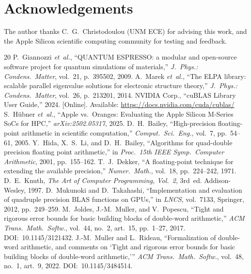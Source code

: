 \documentclass[conference]{IEEEtran}
\begin{document}
\section*{Acknowledgements}
The author thanks C.~G.~Christodoulou (UNM ECE) for advising this work, and the Apple Silicon scientific computing community for testing and feedback.
\balance

\begin{thebibliography}{20}
P.~Giannozzi \emph{et~al.}, ``QUANTUM ESPRESSO: a modular and open-source software project for quantum simulations of materials,'' \emph{J.~Phys.: Condens.\ Matter}, vol.~21, p.~395502, 2009.
A.~Marek \emph{et~al.}, ``The ELPA library: scalable parallel eigenvalue solutions for electronic structure theory,'' \emph{J.~Phys.: Condens.\ Matter}, vol.~26, p.~213201, 2014.
NVIDIA Corp., ``cuBLAS Library User Guide,'' 2024. [Online]. Available: \url{https://docs.nvidia.com/cuda/cublas/}
S.~H\"ubner \emph{et~al.}, ``Apple vs.\ Oranges: Evaluating the Apple Silicon M-Series SoCs for HPC,'' \emph{arXiv:2502.05317}, 2025.
D.~H.~Bailey, ``High-precision floating-point arithmetic in scientific computation,'' \emph{Comput.\ Sci.\ Eng.}, vol.~7, pp.~54--61, 2005.
Y.~Hida, X.~S.~Li, and D.~H.~Bailey, ``Algorithms for quad-double precision floating point arithmetic,'' in \emph{Proc.\ 15th IEEE Symp.\ Computer Arithmetic}, 2001, pp.~155--162.
T.~J.~Dekker, ``A floating-point technique for extending the available precision,'' \emph{Numer.\ Math.}, vol.~18, pp.~224--242, 1971.
D.~E.~Knuth, \emph{The Art of Computer Programming, Vol.~2}, 3rd~ed. Addison-Wesley, 1997.
D.~Mukunoki and D.~Takahashi, ``Implementation and evaluation of quadruple precision BLAS functions on GPUs,'' in \emph{LNCS}, vol.~7133, Springer, 2012, pp.~249--259.
M.~Joldes, J.-M.~Muller, and V.~Popescu, ``Tight and rigorous error bounds for basic building blocks of double-word arithmetic,'' \emph{ACM Trans.\ Math.\ Softw.}, vol.~44, no.~2, art.~15, pp.~1--27, 2017. DOI:~10.1145/3121432.
J.-M.~Muller and L.~Rideau, ``Formalization of double-word arithmetic, and comments on `Tight and rigorous error bounds for basic building blocks of double-word arithmetic,''' \emph{ACM Trans.\ Math.\ Softw.}, vol.~48, no.~1, art.~9, 2022. DOI:~10.1145/3484514.

\end{thebibliography}
\end{document}
